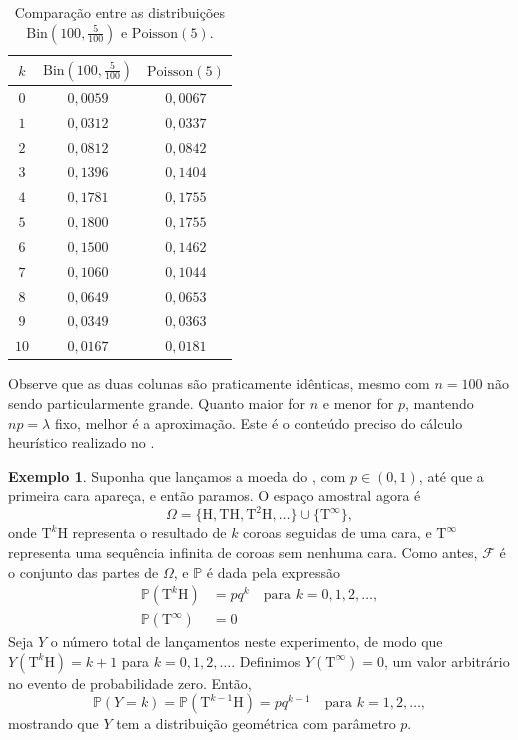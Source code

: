 \documentclass[12pt,portuguese]{article}
\theoremstyle{definition}
\newtheorem{example}[example]{Exemplo}
\begin{document}
\begin{table}[H]
\centering
\setlength{\tabcolsep}{10pt}
\small
\caption{Comparação entre as distribuições $\mathrm{Bin}(100,\tfrac{5}{100})$ e
$\mathrm{Poisson}(5)$.}
\label{tab:poisson-aproximacao}
\begin{tabular}{c c c}
\toprule
$k$ & $\mathrm{Bin}(100,\tfrac{5}{100})$ & $\mathrm{Poisson}(5)$ \\
\midrule
$0$  & $0{,}0059$ & $0{,}0067$ \\
$1$  & $0{,}0312$ & $0{,}0337$ \\
$2$  & $0{,}0812$ & $0{,}0842$ \\
$3$  & $0{,}1396$ & $0{,}1404$ \\
$4$  & $0{,}1781$ & $0{,}1755$ \\
$5$  & $0{,}1800$ & $0{,}1755$ \\
$6$  & $0{,}1500$ & $0{,}1462$ \\
$7$  & $0{,}1060$ & $0{,}1044$ \\
$8$  & $0{,}0649$ & $0{,}0653$ \\
$9$  & $0{,}0349$ & $0{,}0363$ \\
$10$ & $0{,}0167$ & $0{,}0181$ \\
\bottomrule
\end{tabular}
\end{table}

Observe que as duas colunas são praticamente idênticas, mesmo com $n=100$ não sendo
particularmente grande. Quanto maior for $n$ e menor for $p$, mantendo $np=\lambda$
fixo, melhor é a aproximação. Este é o conteúdo preciso do cálculo heurístico
realizado no .

\begin{example}\label{ex:geometrica-primeira-cara}
  Suponha que lançamos a moeda do , com
  \(p\in(0,1)\), até que a primeira cara apareça, e então paramos. O espaço
  amostral agora é
  \[
    \Omega = \{\mathrm{H}, \mathrm{TH}, \mathrm{T}^2\mathrm{H}, \dots\}
    \cup \{\mathrm{T}^\infty\},
  \]
  onde \(\mathrm{T}^k\mathrm{H}\) representa o resultado de \(k\) coroas
  seguidas de uma cara, e \(\mathrm{T}^\infty\) representa uma sequência
  infinita de coroas sem nenhuma cara. Como antes, \(\mathcal{F}\) é o
  conjunto das partes de \(\Omega\), e \(\mathbb{P}\) é dada pela expressão
  \[
    \begin{aligned}
      \mathbb{P}(\mathrm{T}^k\mathrm{H}) &= pq^k \quad \text{para }
        k = 0, 1, 2, \dots, \\
      \mathbb{P}(\mathrm{T}^\infty) &= 0
    \end{aligned}
  \]
  Seja \(Y\) o número total de lançamentos neste experimento, de modo que
  \(Y(\mathrm{T}^k\mathrm{H}) = k + 1\) para \(k=0,1,2,\dots\). Definimos
  \(Y(\mathrm{T}^\infty)=0\), um valor arbitrário no evento de probabilidade
  zero. Então,
  \[
    \mathbb{P}(Y = k) = \mathbb{P}(\mathrm{T}^{k-1}\mathrm{H}) = pq^{k-1}
    \quad \text{para } k = 1, 2, \dots,
  \]
  mostrando que \(Y\) tem a distribuição geométrica com parâmetro \(p\).
\end{example}
\end{document}
